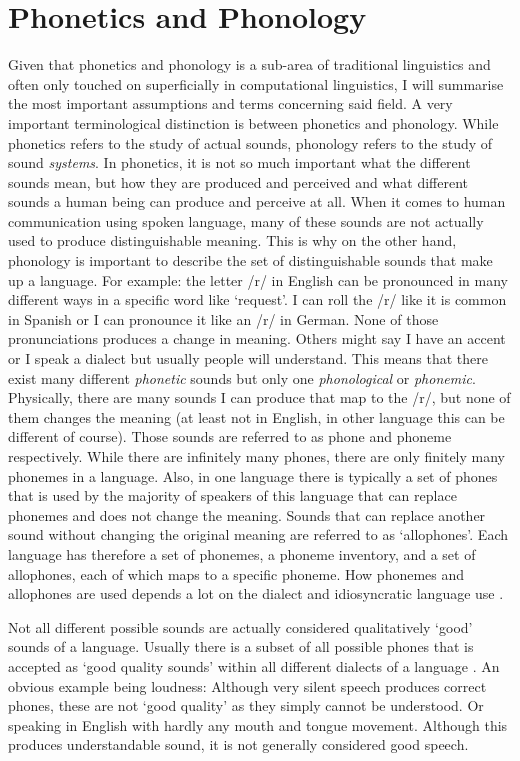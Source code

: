 \section{Phonetics and Phonology}
\label{phonology}
Given that phonetics and phonology is a sub-area of traditional linguistics and often only touched on superficially in computational linguistics, I will summarise the most important assumptions and terms concerning said field. A very important terminological distinction is between phonetics and phonology. While phonetics refers to the study of actual sounds, phonology refers to the study of sound \textit{systems}. In phonetics, it is not so much important what the different sounds mean, but how they are produced and perceived and what different sounds a human being can produce and perceive at all. When it comes to human communication using spoken language, many of these sounds are not actually used to produce distinguishable meaning. This is why on the other hand, phonology is important to describe the set of distinguishable sounds that make up a language. For example: the letter /r/ in English can be pronounced in many different ways in a specific word like `request'. I can roll the /r/ like it is common in Spanish or I can pronounce it like an /r/ in German. None of those pronunciations produces a change in meaning. Others might say I have an accent or I speak a dialect but usually people will understand. This means that there exist many different \textit{phonetic} sounds but only one \textit{phonological} or \textit{phonemic}. Physically, there are many sounds I can produce that map to the /r/, but none of them changes the meaning (at least not in English, in other language this can be different of course). Those sounds are referred to as phone and phoneme respectively. While there are infinitely many phones, there are only finitely many phonemes in a language. Also, in one language there is typically a set of phones that is used by the majority of speakers of this language that can replace phonemes and does not change the meaning. Sounds that can replace another sound without changing the original meaning are referred to as `allophones'. Each language has therefore a set of phonemes, a phoneme inventory, and a set of allophones, each of which maps to a specific phoneme. How phonemes and allophones are used depends a lot on the dialect and idiosyncratic language use \citep{Intro.2007}.  

Not all different possible sounds are actually considered qualitatively `good' sounds of a language. Usually there is a subset of all possible phones that is accepted as `good quality sounds' within all different dialects of a language \citep{Intro.2007}. An obvious example being loudness: Although very silent speech produces correct phones, these are not `good quality' as they simply cannot be understood. Or speaking in English with hardly any mouth and tongue movement. Although this produces understandable sound, it is not generally considered good speech. 

